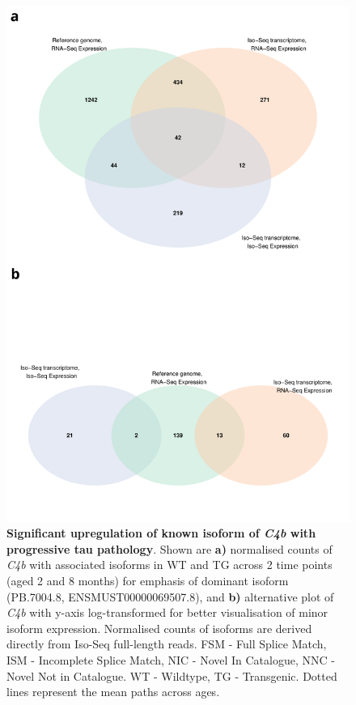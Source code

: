 \begin{figure}[!htp]
	\centering
	\includegraphics[page=12,scale = 0.55]{Figures/WholeDifferentialAnalysis.pdf}
	\captionsetup{width=0.95\textwidth}
	\caption[Differential Isoform Expression: Changes in transcript expression of isoforms associated with \textit{C4b}]%
	{\textbf{Significant upregulation of known isoform of \textit{C4b} with progressive tau pathology}. Shown are \textbf{a)} normalised counts of \textit{C4b} with associated isoforms in WT and TG across 2 time points (aged 2 and 8 months) for emphasis of dominant isoform (PB.7004.8, ENSMUST00000069507.8), and \textbf{b)} alternative plot of \textit{C4b} with y-axis log-transformed for better visualisation of minor isoform expression. Normalised counts of isoforms are derived directly from Iso-Seq full-length reads. FSM - Full Splice Match, ISM - Incomplete Splice Match, NIC - Novel In Catalogue, NNC - Novel Not in Catalogue. WT - Wildtype, TG - Transgenic. Dotted lines represent the mean paths across ages.}   
	\label{fig:DEI_c4b}
\end{figure}

